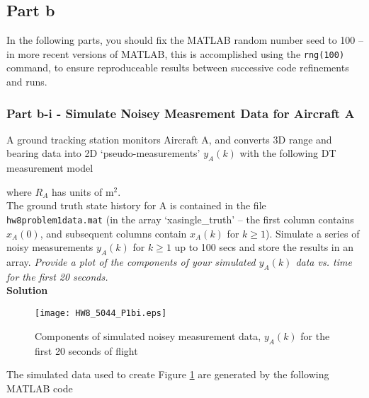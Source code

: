 \documentclass[]{article}
\begin{document}
\subsection*{Part b}

In the following parts, you should fix the MATLAB random number seed to 100 – in more recent versions of MATLAB, this is accomplished using the \texttt{rng(100)} command, to ensure reproduceable results between successive code refinements and runs.

\subsubsection*{Part b-i - Simulate Noisey Measrement Data for Aircraft A}

A ground tracking station monitors Aircraft A, and converts 3D range and bearing data into 2D ‘pseudo-measurements’ $y_A(k)$ with the following DT measurement model

\noindent where $R_A$ has units of $\text{m}^2$.\\

\noindent The ground truth state history for A is contained in the file \texttt{hw8problem1data.mat} (in the array ‘xasingle\_truth’ – the first column contains $x_A(0)$, and subsequent columns contain $x_A(k)$ for $k \geq 1$). Simulate a series of noisy measurements $y_A(k)$ for $k \geq 1$ up to 100 secs and store the results in an array. \textit{Provide a plot of the components of your simulated $y_A(k)$ data vs. time for the first 20 seconds.}\\

\noindent\textbf{Solution}\\


\begin{figure}[H]
	\begin{center}  
		\texttt{[image: HW8\_5044\_P1bi.eps]}  
		\caption{Components of simulated noisey measurement data, $y_A(k)$ for the first 20 seconds of flight}
		\label{fig:HW8_5044_P1bi}
	\end{center}  
\end{figure}

\noindent The simulated data used to create Figure \ref{fig:HW8_5044_P1bi} are generated by the following MATLAB code
\end{document}
